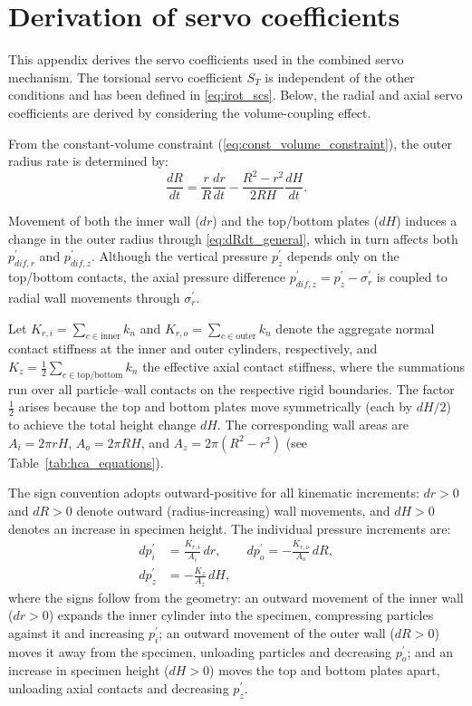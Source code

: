 \section{Derivation of servo coefficients}
\label{sec:appendix_servo}

This appendix derives the servo coefficients used in the combined servo mechanism. The torsional servo coefficient $S_T$ is independent of the other conditions and has been defined in \cref{eq:irot_scs}. Below, the radial and axial servo coefficients are derived by considering the volume-coupling effect.

From the constant-volume constraint (\cref{eq:const_volume_constraint}), the outer radius rate is determined by:
\begin{equation}
\frac{dR}{dt} = \frac{r}{R}\frac{dr}{dt} - \frac{R^2-r^2}{2RH}\frac{dH}{dt}.
\label{eq:dRdt_general}
\end{equation}

Movement of both the inner wall ($dr$) and the top/bottom plates ($dH$) induces a change in the outer radius through \cref{eq:dRdt_general}, which in turn affects both $p_{dif,r}^{\prime}$ and $p_{dif,z}^{\prime}$. Although the vertical pressure $p_z^{\prime}$ depends only on the top/bottom contacts, the axial pressure difference $p_{dif,z}^{\prime}=p_z^{\prime}-\sigma_r^{\prime}$ is coupled to radial wall movements through $\sigma_r^{\prime}$.

Let $K_{r,i}=\sum_{c\in\mathrm{inner}} k_n$ and $K_{r,o}=\sum_{c\in\mathrm{outer}} k_n$ denote the aggregate normal contact stiffness at the inner and outer cylinders, respectively, and $K_z=\frac{1}{2}\sum_{c\in\mathrm{top/bottom}} k_n$ the effective axial contact stiffness, where the summations run over all particle--wall contacts on the respective rigid boundaries. The factor $\frac{1}{2}$ arises because the top and bottom plates move symmetrically (each by $dH/2$) to achieve the total height change $dH$. The corresponding wall areas are $A_i=2\pi rH$, $A_o=2\pi RH$, and $A_z=2\pi(R^2-r^2)$ (see Table~\ref{tab:hca_equations}).

The sign convention adopts outward-positive for all kinematic increments: $dr>0$ and $dR>0$ denote outward (radius-increasing) wall movements, and $dH>0$ denotes an increase in specimen height. The individual pressure increments are:
\begin{align}
dp_i^{\prime} &= \frac{K_{r,i}}{A_i}\,dr,\qquad
dp_o^{\prime} = -\frac{K_{r,o}}{A_o}\,dR, \label{eq:dp_individual_r}\\[4pt]
dp_z^{\prime} &= -\frac{K_z}{A_z}\,dH, \label{eq:dp_individual_z}
\end{align}
where the signs follow from the geometry: an outward movement of the inner wall ($dr>0$) expands the inner cylinder into the specimen, compressing particles against it and increasing $p_i^{\prime}$; an outward movement of the outer wall ($dR>0$) moves it away from the specimen, unloading particles and decreasing $p_o^{\prime}$; and an increase in specimen height ($dH>0$) moves the top and bottom plates apart, unloading axial contacts and decreasing $p_z^{\prime}$.


